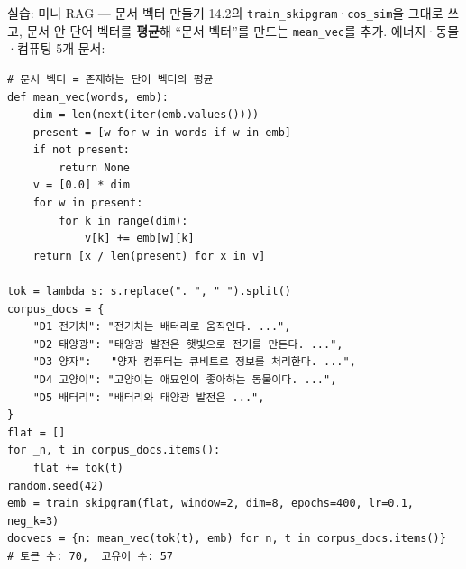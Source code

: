\begin{frame}[fragile,shrink=31]{실습: 미니 RAG --- 문서 벡터 만들기}
  14.2의 \texttt{train\_skipgram}·\texttt{cos\_sim}을 그대로 쓰고,
  문서 안 단어 벡터를 \textbf{평균}해 ``문서 벡터''를 만드는
  \texttt{mean\_vec}를 추가. \; 에너지·동물·컴퓨팅 5개 문서:
\begin{lstlisting}
# 문서 벡터 = 존재하는 단어 벡터의 평균
def mean_vec(words, emb):
    dim = len(next(iter(emb.values())))
    present = [w for w in words if w in emb]
    if not present:
        return None
    v = [0.0] * dim
    for w in present:
        for k in range(dim):
            v[k] += emb[w][k]
    return [x / len(present) for x in v]

tok = lambda s: s.replace(". ", " ").split()
corpus_docs = {
    "D1 전기차": "전기차는 배터리로 움직인다. ...",
    "D2 태양광": "태양광 발전은 햇빛으로 전기를 만든다. ...",
    "D3 양자":   "양자 컴퓨터는 큐비트로 정보를 처리한다. ...",
    "D4 고양이": "고양이는 애묘인이 좋아하는 동물이다. ...",
    "D5 배터리": "배터리와 태양광 발전은 ...",
}
flat = []
for _n, t in corpus_docs.items():
    flat += tok(t)
random.seed(42)
emb = train_skipgram(flat, window=2, dim=8, epochs=400, lr=0.1, neg_k=3)
docvecs = {n: mean_vec(tok(t), emb) for n, t in corpus_docs.items()}
# 토큰 수: 70,  고유어 수: 57
\end{lstlisting}
\end{frame}
